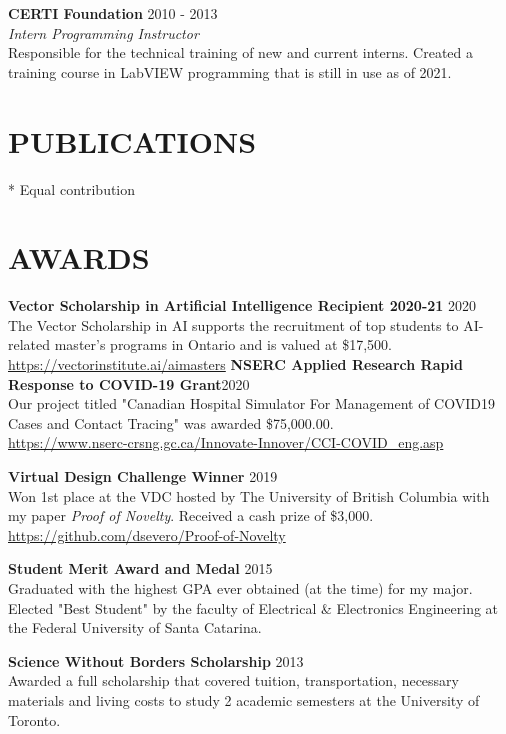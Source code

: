 \documentclass[margin, line]{res}
\begin{document}
\begin{resume}
\textbf{CERTI Foundation} \hfill 2010 - 2013\\
{\sl Intern Programming Instructor}\\
Responsible for the technical training of new and current interns. Created a training course in LabVIEW programming that is still in use as of 2021.

\section{PUBLICATIONS}
\nocite{Severo2021-cf}
\nocite{Ruan2021-xb}
\nocite{Reys2020-su}
\printbibliography[heading=none]
* Equal contribution

\section{AWARDS}
\textbf{Vector Scholarship in Artificial Intelligence Recipient 2020-21} \hfill 2020\\
The Vector Scholarship in AI supports the recruitment of top students to AI-related master’s programs in Ontario and is valued at \$17,500.\\
\url{https://vectorinstitute.ai/aimasters}
\newpage
\textbf{NSERC Applied Research Rapid Response to COVID-19 Grant}\hfill 2020\\
Our project titled "Canadian Hospital Simulator For Management of COVID19 Cases and Contact Tracing" was awarded \$75,000.00.\\
\url{https://www.nserc-crsng.gc.ca/Innovate-Innover/CCI-COVID_eng.asp}

\textbf{Virtual Design Challenge Winner} \hfill 2019\\
Won 1st place at the VDC hosted by The University of British Columbia with my paper \emph{Proof of Novelty}. Received a cash prize of \$3,000.\\
\url{https://github.com/dsevero/Proof-of-Novelty}

\textbf{Student Merit Award and Medal} \hfill 2015\\
Graduated with the highest GPA ever obtained (at the time) for my major. Elected "Best Student" by the faculty of Electrical \& Electronics Engineering at the Federal University of Santa Catarina.

\textbf{Science Without Borders Scholarship} \hfill 2013\\
Awarded a full scholarship that covered tuition, transportation, necessary materials and living costs to study 2 academic semesters at the University of Toronto.


\end{resume}
\end{document}
